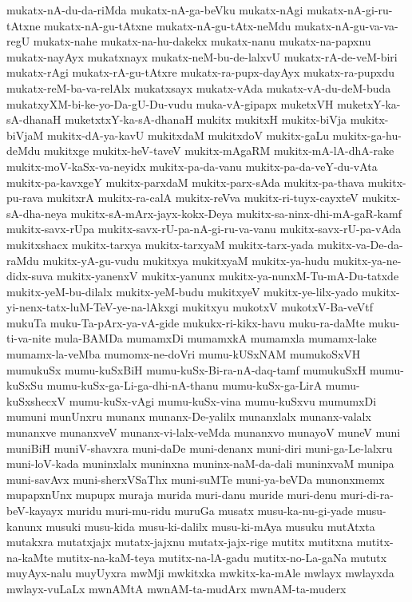 {mukatx-nA-du-da-riMda
mukatx-nA-ga-beVku
mukatx-nAgi
mukatx-nA-gi-ru-tAtxne
mukatx-nA-gu-tAtxne
mukatx-nA-gu-tAtx-neMdu
mukatx-nA-gu-va-va-regU
mukatx-nahe
mukatx-na-hu-dakekx
mukatx-nanu
mukatx-na-papxnu
mukatx-nayAyx
mukatxnayx
mukatx-neM-bu-de-lalxvU
mukatx-rA-de-veM-biri
mukatx-rAgi
mukatx-rA-gu-tAtxre
mukatx-ra-pupx-dayAyx
mukatx-ra-pupxdu
mukatx-reM-ba-va-relAlx
mukatxsayx
mukatx-vAda
mukatx-vA-du-deM-buda
mukatxyXM-bi-ke-yo-Da-gU-Du-vudu
muka-vA-gipapx
muketxVH
muketxY-ka-sA-dhanaH
muketxtxY-ka-sA-dhanaH
mukitx
mukitxH
mukitx-biVja
mukitx-biVjaM
mukitx-dA-ya-kavU
mukitxdaM
mukitxdoV
mukitx-gaLu
mukitx-ga-hu-deMdu
mukitxge
mukitx-heV-taveV
mukitx-mAgaRM
mukitx-mA-lA-dhA-rake
mukitx-moV-kaSx-va-neyidx
mukitx-pa-da-vanu
mukitx-pa-da-veY-du-vAta
mukitx-pa-kavxgeY
mukitx-parxdaM
mukitx-parx-sAda
mukitx-pa-thava
mukitx-pu-rava
mukitxrA
mukitx-ra-calA
mukitx-reVva
mukitx-ri-tuyx-cayxteV
mukitx-sA-dha-neya
mukitx-sA-mArx-jayx-kokx-Deya
mukitx-sa-ninx-dhi-mA-gaR-kamf
mukitx-savx-rUpa
mukitx-savx-rU-pa-nA-gi-ru-va-vanu
mukitx-savx-rU-pa-vAda
mukitxshacx
mukitx-tarxya
mukitx-tarxyaM
mukitx-tarx-yada
mukitx-va-De-da-raMdu
mukitx-yA-gu-vudu
mukitxya
mukitxyaM
mukitx-ya-hudu
mukitx-ya-ne-didx-suva
mukitx-yanenxV
mukitx-yanunx
mukitx-ya-nunxM-Tu-mA-Du-tatxde
mukitx-yeM-bu-dilalx
mukitx-yeM-budu
mukitxyeV
mukitx-ye-lilx-yado
mukitx-yi-nenx-tatx-luM-TeV-ye-na-lAkxgi
mukitxyu
mukotxV
mukotxV-Ba-veVtf
mukuTa
muku-Ta-pArx-ya-vA-gide
mukukx-ri-kikx-havu
muku-ra-daMte
muku-ti-va-nite
mula-BAMDa
mumamxDi
mumamxkA
mumamxla
mumamx-lake
mumamx-la-veMba
mumomx-ne-doVri
mumu-kUSxNAM
mumukoSxVH
mumukuSx
mumu-kuSxBiH
mumu-kuSx-Bi-ra-nA-daq-tamf
mumukuSxH
mumu-kuSxSu
mumu-kuSx-ga-Li-ga-dhi-nA-thanu
mumu-kuSx-ga-LirA
mumu-kuSxshecxV
mumu-kuSx-vAgi
mumu-kuSx-vina
mumu-kuSxvu
mumumxDi
mumuni
munUnxru
munanx
munanx-De-yalilx
munanxlalx
munanx-valalx
munanxve
munanxveV
munanx-vi-lalx-veMda
munanxvo
munayoV
muneV
muni
muniBiH
muniV-shavxra
muni-daDe
muni-denanx
muni-diri
muni-ga-Le-lalxru
muni-loV-kada
muninxlalx
muninxna
muninx-naM-da-dali
muninxvaM
munipa
muni-savAvx
muni-sherxVSaThx
muni-suMTe
muni-ya-beVDa
munonxmemx
mupapxnUnx
mupupx
muraja
murida
muri-danu
muride
muri-denu
muri-di-ra-beV-kayayx
muridu
muri-mu-ridu
muruGa
musatx
musu-ka-nu-gi-yade
musu-kanunx
musuki
musu-kida
musu-ki-dalilx
musu-ki-mAya
musuku
mutAtxta
mutakxra
mutatxjajx
mutatx-jajxnu
mutatx-jajx-rige
mutitx
mutitxna
mutitx-na-kaMte
mutitx-na-kaM-teya
mutitx-na-lA-gadu
mutitx-no-La-gaNa
mututx
muyAyx-nalu
muyUyxra
mwMji
mwkitxka
mwkitx-ka-mAle
mwlayx
mwlayxda
mwlayx-vuLaLx
mwnAMtA
mwnAM-ta-mudArx
mwnAM-ta-muderx
}
